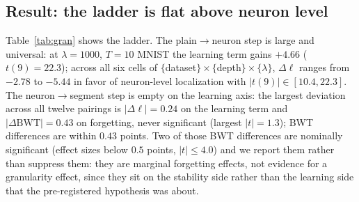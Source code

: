 \documentclass[10pt]{article}
\begin{document}
\subsection{Result: the ladder is flat above neuron level}

Table~\ref{tab:gran} shows the ladder. The plain$\to$neuron step is large
and universal: at $\lambda{=}1000$, $T{=}10$ MNIST the learning term gains
$+4.66$ ($t(9){=}22.3$); across all six cells of
$\{$dataset$\}\times\{$depth$\}\times\{\lambda\}$, $\Delta\ell$ ranges from
$-2.78$ to $-5.44$ in favor of neuron-level localization with
$|t(9)| \in [10.4, 22.3]$. The neuron$\to$segment step is empty on the learning axis: the
largest deviation across all twelve pairings is $|\Delta\ell| = 0.24$ on the learning
term and $|\Delta\mathrm{BWT}| = 0.43$ on forgetting,
never significant (largest $|t| = 1.3$); BWT differences are within
$0.43$ points. Two of those BWT differences are nominally significant
(effect sizes below $0.5$ points, $|t| \le 4.0$) and we report them rather
than suppress them: they are marginal forgetting effects, not evidence for
a granularity effect, since they sit on the stability side rather than the
learning side that the pre-registered hypothesis was about.
\end{document}
